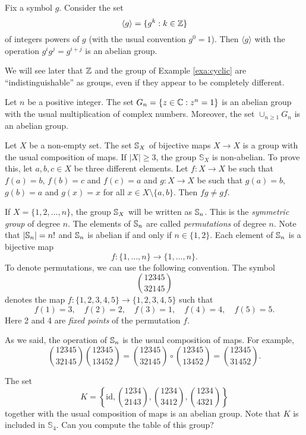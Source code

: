 \begin{example}
\label{exa:cyclic}
Fix a symbol $g$. Consider the set  
\[
\langle g\rangle=\{g^k:k\in\mathbb{Z}\}
\]
of integers powers of $g$ (with the usual convention $g^0=1$). Then
$\langle g\rangle$
with the operation $g^ig^j=g^{i+j}$ is an abelian group. 
\end{example}

We will see later that $\mathbb{Z}$ and the group of 
Example \ref{exa:cyclic} are ``indistinguishable'' 
as groups, even if they appear to be completely different. 

\begin{example}
Let $n$ be a positive integer. The set 
$G_n=\{z\in\mathbb{C}:z^n=1\}$ is an abelian group with
the usual multiplication of complex numbers. Moreover, the set 
$\cup_{n\geq1}G_n$ is an abelian group. 
\end{example}

\begin{example}
    Let $X$ be a non-empty set. The set $\mathbb{S}_X$ of bijective maps $X\to X$ 
    is a group with the usual composition of maps. If $|X|\geq3$, the group
    $\mathbb{S}_{X}$ is non-abelian. To prove this, let $a,b,c\in
        X$ be three different elements. Let $f\colon X\to X$ be such that
        $f(a)=b$, $f(b)=c$ and $f(c)=
a$ and $g\colon X\to
        X$ be such that $g(a)=b$, $g(b)=a$ and $g(x)=x$ for all $x\in
        X\setminus\{a,b\}$.  Then $fg\ne gf$.
\end{example}

If $X=\{1,2,\dots,n\}$, the group $\mathbb{S}_X$ will be written as $\mathbb{S}_n$. This is
the \emph{symmetric group} of degree $n$. The elements of $\mathbb{S}_n$ are
called \emph{permutations} of degree $n$. 
Note that $|\mathbb{S}_n|=n!$ and $\mathbb{S}_n$
is abelian if and only if $n\in\{1,2\}$. Each element of $\mathbb{S}_n$ is a 
bijective map 
\[
f\colon\{1,\dots,n\}\to \{1,\dots,n\}.
\]
To denote permutations, 
we can use the following convention. The symbol  
\[
\binom{12345}{32145}
\]
denotes the map 
$f\colon\{1,2,3,4,5\}\to\{1,2,3,4,5\}$ such that 
\[
f(1)=3,
\quad f(2)=2,
\quad f(3)=1, 
\quad f(4)=4,
\quad f(5)=5.
\]
Here 2 and 4 are \emph{fixed points} of the permutation $f$. 

As we said, the operation of $\mathbb{S}_n$ is the usual
composition of maps. 
For example, 
\[
\binom{12345}{32145}
\binom{12345}{13452}
=
\binom{12345}{32145}
\circ 
\binom{12345}{13452}
=\binom{12345}{31452}.
\]

\begin{example}
The set  
\[
K=\left\{ \mathrm{id},\binom{1234}{2143},\binom{1234}{3412},\binom{1234}{4321}\right\}
\]
together with the usual composition of maps is an abelian group. 
Note that $K$ is included in $\mathbb{S}_{4}$.
Can you compute the table of this group?
\end{example}

